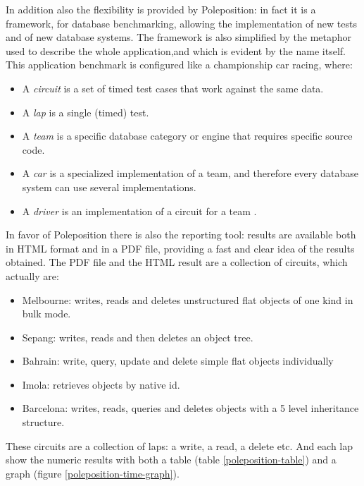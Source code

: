 In addition also the flexibility is provided by Poleposition: in fact it is a framework, for database benchmarking, allowing the implementation of new tests and of new database systems. The framework is also simplified by the metaphor used to describe the whole application,and which is evident by the name itself. This application benchmark is configured like a championship car racing, where:
\begin{itemize}
	\item A \emph{circuit} is a set of timed test cases that work against the same data.
	\item A \emph{lap} is a single (timed) test.
	\item A \emph{team} is a specific database category or engine that requires specific source code.
	\item A \emph{car} is a specialized implementation of a team, and therefore every database system can use several implementations.
	\item A \emph{driver} is an implementation of a circuit for a team .
\end{itemize}

In favor of Poleposition there is also the reporting tool: results are available both in HTML format and in a PDF file, providing a fast and clear idea of the results obtained. The PDF file and the HTML result are a collection of circuits, which actually are:
\begin{itemize}
	\item Melbourne: writes, reads and deletes unstructured flat objects of one kind in bulk mode.
	\item Sepang: writes, reads and then deletes an object tree.
	\item Bahrain: write, query, update and delete simple flat objects individually
	\item Imola: retrieves objects by native id.
	\item Barcelona: writes, reads, queries and deletes objects with a 5 level inheritance structure.
\end{itemize}
These circuits are a collection of laps: a write, a read, a delete etc. And each lap show the numeric results with both a table (table \ref{poleposition-table}) and a graph (figure \ref{poleposition-time-graph}).

